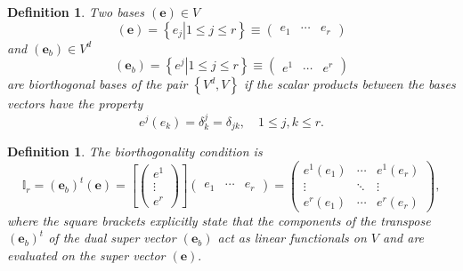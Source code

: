 \documentclass[aps,preprint]{revtex4}
\newtheorem{definition}[theorem]{Definition}
\begin{document}
\begin{definition}
\label{Biorthogonality} Two bases $\left( \boldsymbol{e}\right) \in V$ 
\begin{equation}
\left( \boldsymbol{e}\right) =\left\{ \left. e_{j}\right\vert 1\leq j\leq
r\right\} \equiv \left( 
\begin{array}{ccc}
e_{1} & \cdots & e_{r}%
\end{array}%
\right)
\end{equation}%
and $\left( \boldsymbol{e}_{b}\right) \in V^{d}$ 
\begin{equation}
\left( \boldsymbol{e}_{b}\right) =\left\{ \left. e^{j}\right\vert 1\leq
j\leq r\right\} \equiv \left( 
\begin{array}{ccc}
e^{1} & \cdots & e^{r}%
\end{array}%
\right)
\end{equation}%
are \emph{biorthogonal} bases of the pair $\left\{ V^{d},V\right\} $ if the
scalar products between the bases vectors have the property%
\begin{equation}
e^{j}\left( e_{k}\right) =\delta _{k}^{j}=\delta _{jk},\quad 1\leq j,k\leq r.
\end{equation}
\end{definition}

\begin{definition}
\label{The biorthogonality condition} The biorthogonality condition is 
\begin{equation}
\mathbb{I}_{r}=\left( \boldsymbol{e}_{b}\right) ^{t}\left( \boldsymbol{e}%
\right) =\left[ \left( 
\begin{array}{c}
e^{1} \\ 
\vdots \\ 
e^{r}%
\end{array}%
\right) \right] \left( 
\begin{array}{ccc}
e_{1} & \cdots & e_{r}%
\end{array}%
\right) =\left( 
\begin{array}{ccc}
e^{1}\left( e_{1}\right) & \cdots & e^{1}\left( e_{r}\right) \\ 
\vdots & \ddots & \vdots \\ 
e^{r}\left( e_{1}\right) & \cdots & e^{r}\left( e_{r}\right)%
\end{array}%
\right) ,
\end{equation}%
where the square brackets explicitly state that the components of the
transpose $\left( \boldsymbol{e}_{b}\right) ^{t}$ of the dual super vector $%
\left( \boldsymbol{e}_{b}\right) $ act as linear functionals on $V$ and are
evaluated on the super vector $\left( \boldsymbol{e}\right) .$
\end{definition}
\end{document}
